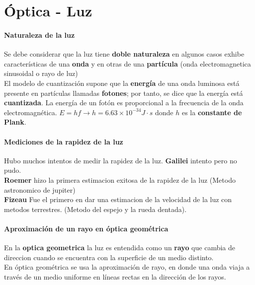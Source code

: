 \documentclass[10pt]{article}
\begin{document}
 
\maketitle

\section{Óptica - Luz}

\paragraph{Naturaleza de la luz}

Se debe considerar que la luz tiene \textbf{doble naturaleza} en algunos casos exhibe características de una \textbf{onda} y en otras de una \textbf{partícula} (onda electromagnetica sinusoidal o rayo de luz)\\
\linebreak
El modelo de cuantización supone que la \textbf{energía} de una onda luminosa está presente en partículas llamadas \textbf{fotones}; por tanto, se dice que la energía está \textbf{cuantizada}. La energía de un fotón es proporcional a la frecuencia de la onda electromagnética. $E = hf \rightarrow h = 6.63 \times 10^{-34} J\cdot s$ donde $h$ es la \textbf{constante de Plank}.\\

\paragraph{Mediciones de la rapidez de la luz}
Hubo muchos intentos de medir la rapidez de la luz. \textbf{Galilei} intento pero no pudo.\\ 
\textbf{Roemer} hizo la primera estimacion exitosa de la rapidez de la luz (Metodo astronomico de jupiter)\\
\textbf{Fizeau} Fue el primero en dar una estimacion de la velocidad de la luz con metodos terrestres. (Metodo del espejo y la rueda dentada).
\paragraph{Aproximación de un rayo en óptica geométrica}

En la \textbf{optica geometrica} la luz es entendida como un \textbf{rayo} que cambia de direccion cuando se encuentra con la superficie de un medio distinto.\\
\linebreak
En óptica geométrica se usa la aproximación de rayo, en donde una onda viaja a través de un medio uniforme en líneas rectas
en la dirección de los rayos.
\end{document}
